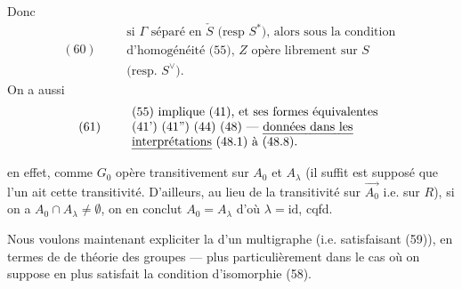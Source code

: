 \documentclass[11pt,a4paper]{article}
\begin{document}
Donc
\[
(60) \qquad
\begin{array}{l}
\text{si } \Gamma \text{ séparé en } \check{S} \text{ (resp } S^{*}\text{), alors sous la condition} \\
\text{d'homogénéité (55), } Z \text{ opère librement sur } S \\
\text{(resp. } S^{\vee}\text{).}
\end{array}
\]
On a aussi
\[
(61) \qquad
\begin{array}{l}
\text{(55) implique (41), et ses formes équivalentes} \\
\text{(41') (41'') (44) (48) --- \uncertain{données dans les}} \\
\text{\uncertain{interprétations} (48.1) à (48.8).}
\end{array}
\]

en effet, comme $G_0$ opère transitivement sur \add{\ill{}} $A_0$ et $A_{\lambda}$ (il suffit \struck{\ill{}} \add{\ill{}} est supposé que l'un ait cette transitivité. D'ailleurs, au lieu de la transitivité sur $\overrightarrow{A_0}$ \struck{\ill{}} i.e. sur $R$), si on \struck{\ill{}} a $A_0 \cap A_{\lambda} \neq \emptyset$, on en conclut $A_0 = A_{\lambda}$ d'où $\lambda = \mathrm{id}$, cqfd.

Nous voulons maintenant expliciter la \struck{\ill{}} \add{\ill{}}  d'un multigraphe  (i.e. satisfaisant (59)), en termes de  de théorie des groupes --- plus particulièrement dans le cas où on suppose en plus satisfait la condition d'isomorphie (58).
\end{document}
